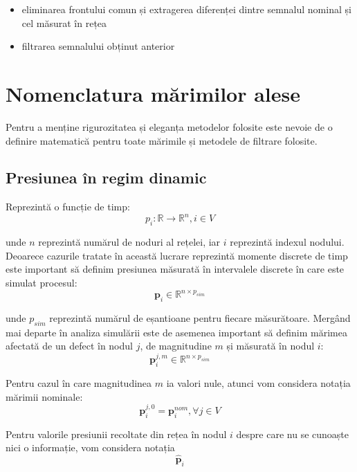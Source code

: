 \begin{itemize}
\item eliminarea frontului comun și extragerea diferenței dintre semnalul nominal și cel măsurat în rețea
\item filtrarea semnalului obținut anterior
\end{itemize}

\section{Nomenclatura mărimilor alese}
\label{sec:nomenclatura}
Pentru a menține rigurozitatea și eleganța metodelor folosite este nevoie de o definire matematică pentru toate mărimile și metodele de filtrare folosite.

\subsection{Presiunea în regim dinamic}
Reprezintă o funcție de timp:
\begin{equation}
p_i : \mathbb{R} \longrightarrow \mathbb{R}^n, i \in V
\label{eq:press:func}
\end{equation}

unde $n$ reprezintă numărul de noduri al rețelei, iar $i$ reprezintă indexul nodului. 
Deoarece cazurile tratate în această lucrare reprezintă momente discrete de timp este important să definim presiunea măsurată în intervalele discrete în care este simulat procesul:
\begin{equation}
\mathbf{p}_i \in \mathbb{R}^{n \times p_{sim}}
\end{equation}

unde $p_{sim}$ reprezintă numărul de eșantioane pentru fiecare măsurătoare. Mergând mai departe în analiza simulării este de asemenea important să definim mărimea afectată de un defect în nodul $j$, de magnitudine $m$ și măsurată în nodul $i$:
\begin{equation}
\mathbf{p}^{j,m}_i \in \mathbb{R}^{n \times p_{sim}}
\end{equation}

Pentru cazul în care magnitudinea $m$ ia valori nule, atunci vom considera notația mărimii nominale:
\begin{equation}
\mathbf{p}^{j,0}_i = \mathbf{p}^{nom}_i, \forall j \in V
\end{equation}

Pentru valorile presiunii recoltate din rețea în nodul $i$ despre care nu se cunoaște nici o informație, vom considera notația
\begin{equation}
\widehat{\mathbf{p}}_i
\label{eq:measured_pressure}
\end{equation}


